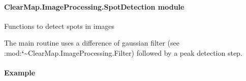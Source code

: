 \documentclass[letterpaper,10pt,english]{sphinxmanual}
\begin{document}
\paragraph{ClearMap.ImageProcessing.SpotDetection module}
\label{api/ClearMap.ImageProcessing:clearmap-imageprocessing-spotdetection-module}\label{api/ClearMap.ImageProcessing:module-ClearMap.ImageProcessing.SpotDetection}
Functions to detect spots in images

The main routine  uses a difference of gaussian filter (see
:mod:{\color{red}\bfseries{}{}`}\textasciitilde{}ClearMap.ImageProcessing.Filter) followed by a peak detection step.
\paragraph{Example}
\end{document}
